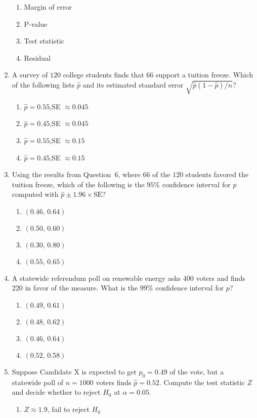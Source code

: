 \documentclass{article}
\begin{document}
\begin{enumerate}
\begin{enumerate}[label=(\Alph*)]
  \item Margin of error
  \item P-value
  \item Test statistic
  \item Residual
  \end{enumerate}
\item A survey of $120$ college students finds that $66$ support a tuition freeze. Which of the following lists $\hat{p}$ and its estimated standard error $\sqrt{\hat{p}(1-\hat{p})/n}$?
  \begin{enumerate}[label=(\Alph*)]
  \item $\hat{p}=0.55$,\quad SE $\approx0.045$
  \item $\hat{p}=0.45$,\quad SE $\approx0.045$
  \item $\hat{p}=0.55$,\quad SE $\approx0.15$
  \item $\hat{p}=0.45$,\quad SE $\approx0.15$
  \end{enumerate}
\item Using the results from Question~6, where $66$ of the $120$ students favored the tuition freeze, which of the following is the $95\%$ confidence interval for $p$ computed with $\hat{p}\pm1.96\times\text{SE}$?
  \begin{enumerate}[label=(\Alph*)]
  \item $(0.46,\,0.64)$
  \item $(0.50,\,0.60)$
  \item $(0.30,\,0.80)$
  \item $(0.55,\,0.65)$
  \end{enumerate}
\item A statewide referendum poll on renewable energy asks $400$ voters and finds $220$ in favor of the measure. What is the $99\%$ confidence interval for $p$?
  \begin{enumerate}[label=(\Alph*)]
  \item $(0.49,\,0.61)$
  \item $(0.48,\,0.62)$
  \item $(0.46,\,0.64)$
  \item $(0.52,\,0.58)$
  \end{enumerate}
\item Suppose Candidate X is expected to get $p_0=0.49$ of the vote, but a statewide poll of $n=1000$ voters finds $\hat{p}=0.52$. Compute the test statistic $Z$ and decide whether to reject $H_0$ at $\alpha=0.05$.
  \begin{enumerate}[label=(\Alph*)]
  \item $Z\approx1.9$, fail to reject $H_0$

\end{enumerate}
\end{enumerate}
\end{document}
